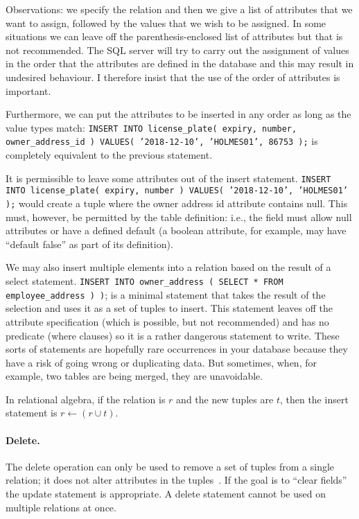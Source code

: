 Observations: we specify the relation and then we give a list of attributes that we want  to assign, followed by the values that we wish to be assigned. In some situations we can leave off the parenthesis-enclosed list of attributes but that is not recommended. The SQL server will try to carry out the assignment of values in the order that the attributes are defined in the database and this may result in undesired behaviour. I therefore insist that the use of the order of attributes is important. 

Furthermore, we can put the attributes to be inserted in any order as long as the value types match: \texttt{INSERT INTO license\_plate( expiry, number, owner\_address\_id ) VALUES( '2018-12-10', 'HOLMES01', 86753 );}  is completely equivalent to the previous statement.

It is permissible to leave some attributes out of the insert statement. \texttt{INSERT INTO license\_plate( expiry, number ) VALUES( '2018-12-10', 'HOLMES01' );} would create a tuple where the owner address id attribute contains null. This must, however, be permitted by the table definition: i.e., the field must allow null attributes or have a defined default (a boolean attribute, for example, may have ``default false'' as part of its definition).

We may also insert multiple elements into a relation based on the result of a select statement. \texttt{INSERT INTO owner\_address ( SELECT * FROM employee\_address ) )}; is a minimal statement that takes the result of the selection and uses it as a set of tuples to insert. This statement leaves off the attribute specification (which is possible, but not recommended) and has no predicate (where clauses) so it is a rather dangerous statement to write. These sorts of statements are hopefully rare occurrences in your database because they have a risk of going wrong or duplicating data. But sometimes, when, for example, two tables are being merged, they are unavoidable.

In relational algebra, if the relation is $r$ and the new tuples are $t$, then the insert statement is $r \leftarrow (r \cup t)$.

\paragraph{Delete.}

The delete operation can only be used to remove a set of tuples from a single relation; it does not alter attributes in the tuples~\cite{dsc}. If the goal is to ``clear fields'' the update statement is appropriate. A delete statement cannot be used on multiple relations at once.

